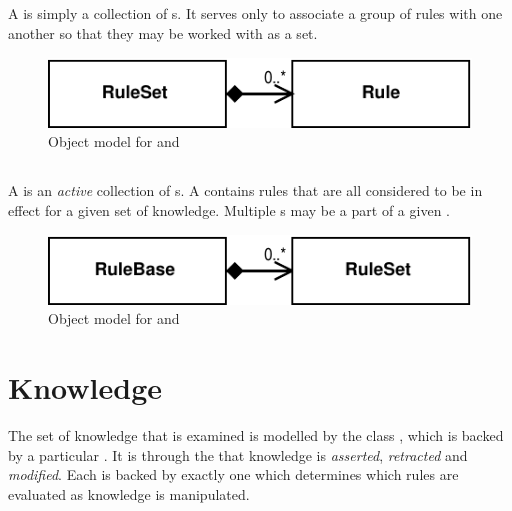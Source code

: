 \subsection{}

A  is simply a collection of s.
It serves only to associate a group of rules with one another so that
they may be worked with as a set.

\begin{figure}
  \begin{center}
  \includegraphics{ruleset}
  \end{center}
  \caption{Object model for  and }
\end{figure}

\subsection{}

A  is an \emph{active} collection of
s.  A  contains rules
that are all considered to be in effect for a given set of
knowledge.  Multiple s may be a part of a 
given .

\begin{figure}
  \begin{center}
  \includegraphics{rulebase}
  \end{center}
  \caption{Object model for  and }
\end{figure}

\section{Knowledge}

The set of knowledge that is examined is modelled by the class
, which is backed by a particular
.  It is through the 
that knowledge is \emph{asserted}, \emph{retracted} and
\emph{modified}.
Each  is backed by exactly one
 which determines which rules are evaluated
as knowledge is manipulated.

